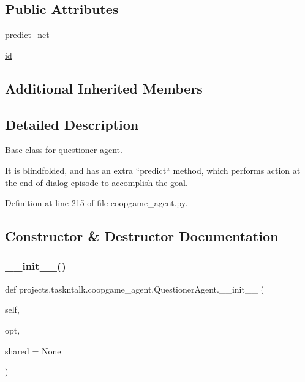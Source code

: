 \subsection*{Public Attributes}
\begin{DoxyCompactItemize}
\item 
\hyperlink{classprojects_1_1taskntalk_1_1coopgame__agent_1_1QuestionerAgent_a91db82359e87c125039573ba9070eab3}{predict\+\_\+net}
\item 
\hyperlink{classprojects_1_1taskntalk_1_1coopgame__agent_1_1QuestionerAgent_a485197cefeb040ec41e7a58ce2efe19c}{id}
\end{DoxyCompactItemize}
\subsection*{Additional Inherited Members}


\subsection{Detailed Description}
\begin{DoxyVerb}Base class for questioner agent.

It is blindfolded, and has an extra ``predict`` method, which performs action at the
end of dialog episode to accomplish the goal.
\end{DoxyVerb}
 

Definition at line 215 of file coopgame\+\_\+agent.\+py.



\subsection{Constructor \& Destructor Documentation}
\mbox{\label{classprojects_1_1taskntalk_1_1coopgame__agent_1_1QuestionerAgent_a09a21a7469462a1ad5d8b55b381e8d87}} 
\subsubsection{\texorpdfstring{\+\_\+\+\_\+init\+\_\+\+\_\+()}{\_\_init\_\_()}}
{\footnotesize\ttfamily def projects.\+taskntalk.\+coopgame\+\_\+agent.\+Questioner\+Agent.\+\_\+\+\_\+init\+\_\+\+\_\+ (\begin{DoxyParamCaption}\item[{}]{self,  }\item[{}]{opt,  }\item[{}]{shared = {\ttfamily None} }\end{DoxyParamCaption})}



